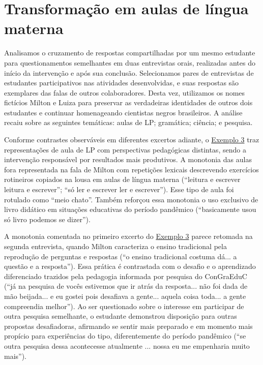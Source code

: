 \section{Transformação em aulas de língua materna}\label{sec-transformaçãoemaulasdelínguamaterna}

Analisamos o cruzamento de respostas compartilhadas por um mesmo
estudante para questionamentos semelhantes em duas entrevistas orais,
realizadas antes do início da intervenção e após sua conclusão.
Selecionamos pares de entrevistas de estudantes participativos nas
atividades desenvolvidas, e suas respostas são exemplares das falas de
outros colaboradores. Desta vez, utilizamos os nomes fictícios Milton e
Luiza para preservar as verdadeiras identidades de outros dois
estudantes e continuar homenageando cientistas negros brasileiros. A
análise recaiu sobre as seguintes temáticas: aulas de LP; gramática;
ciência; e pesquisa.

Conforme contrastes observáveis em diferentes excertos adiante, o
\hyperref[tab-04]{Exemplo 3} traz representações de aula de LP com perspectivas pedagógicas
distintas, sendo a intervenção responsável por resultados mais
produtivos. A monotonia das aulas fora representada na fala de Milton
com repetições lexicais descrevendo exercícios rotineiros copiados na
lousa em aulas de língua materna (``leitura e escrever leitura e
escrever''; ``só ler e escrever ler e escrever''). Esse tipo de aula foi
rotulado como ``meio chato''. Também reforçou essa monotonia o uso
exclusivo de livro didático em situações educativas do período pandêmico
(``basicamente usou só livro podemos se dizer'').





A monotonia comentada no primeiro excerto do \hyperref[tab-04]{Exemplo 3} parece retomada
na segunda entrevista, quando Milton caracteriza o ensino tradicional
pela reprodução de perguntas e respostas (``o ensino tradicional costuma
dá... a questão e a resposta''). Essa prática é contrastada com o
desafio e o aprendizado diferenciado trazidos pela pedagogia informada
por pesquisa do ConGraEduC (``já na pesquisa de vocês estivemos que ir
atrás da resposta... não foi dada de mão beijada... e eu gostei pois
desafiava a gente... aquela coisa toda... a gente compreendia melhor'').
Ao ser questionado sobre o interesse em participar de outra pesquisa
semelhante, o estudante demonstrou disposição para outras propostas
desafiadoras, afirmando se sentir mais preparado e em momento mais
propício para experiências do tipo, diferentemente do período pandêmico
(``se outra pesquisa dessa acontecesse atualmente ... nossa eu me
empenharia muito mais'').

